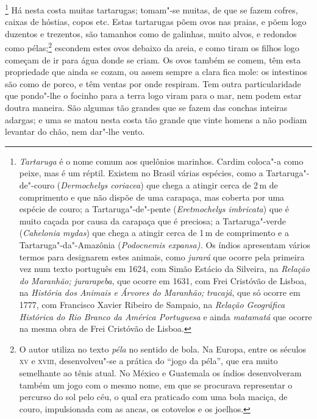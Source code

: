 \footnote{ \textit{Tartaruga} é o nome comum aos
quelônios marinhos. Cardim coloca"-a como peixe, mas é um réptil.
Existem no Brasil várias espécies, como a Tartaruga"-de"-couro
(\textit{Dermochelys coriacea}) que chega a atingir cerca de 2\,m de
comprimento e que não dispõe de uma carapaça, mas coberta por uma
espécie de couro; a Tartaruga"-de"-pente (\textit{Eretmochelys
imbricata}) que é muito caçada por causa da carapaça que é preciosa; a
Tartaruga"-verde (\textit{Cahelonia mydas}) que chega a atingir cerca
de 1\,m de comprimento e a Tartaruga"-da"-Amazônia (\textit{Podocnemis
expansa).} Os índios apresentam vários termos para designarem estes
animais, como \textit{jurará} que ocorre pela primeira vez num texto
português em 1624, com Simão Estácio da Silveira, na \textit{Relação do
Maranhão;} \textit{jurarapeba}, que ocorre em 1631, com Frei Cristóvão
de Lisboa, na \textit{História dos Animais e Árvores do Maranhão;} 
\textit{tracajá}, que só ocorre em 1777, com Francisco Xavier Ribeiro
de Sampaio, na \textit{Relação Geográfica Histórica do Rio Branco da
América Portuguesa} e ainda \textit{matamatá} que ocorre na mesma obra
de Frei Cristóvão de Lisboa.} Há nesta costa muitas
tartarugas; tomam"-se muitas, de que se fazem cofres, caixas de hóstias,
copos etc. Estas tartarugas põem ovos nas praias, e põem logo duzentos
e trezentos, são tamanhos como de galinhas, muito alvos, e redondos
como pélas;\footnote{ O autor utiliza no texto \textit{péla} no sentido
de bola. Na Europa, entre os séculos \textsc{xv} e \textsc{xviii}, desenvolveu"-se a
prática do ``jogo da péla'', que era muito semelhante ao tênis atual. No
México e Guatemala os índios desenvolveram também um jogo com o mesmo
nome, em que se procurava representar o percurso do sol pelo céu, o
qual era praticado com uma bola maciça, de couro, impulsionada com as
ancas, os cotovelos e os joelhos.} escondem estes ovos debaixo da
areia, e como tiram os filhos logo começam de ir para água donde se
criam. Os ovos também se comem, têm esta propriedade que ainda se
cozam, ou assem sempre a clara fica mole: os intestinos são como de
porco, e têm ventas por onde respiram. Tem outra particularidade que
pondo"-lhe o focinho para a terra logo viram para o mar, nem podem
estar doutra maneira. São algumas tão grandes que se fazem das conchas
inteiras adargas; e uma se matou nesta costa tão grande que vinte
homens a não podiam levantar do chão, nem dar"-lhe vento.

